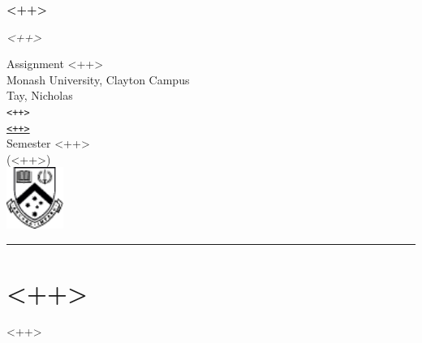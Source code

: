 \documentclass{article}
\newcommand{\metatitle}{<++>}
\newcommand{\metasubtitle}{<++>}
\newcommand{\metaauthor}{Tay, Nicholas}
\newcommand{\metaemail}{<++>}
\begin{document}
\thispagestyle{empty}
\parbox[b]{0.925\textwidth}{
\vspace*{8.5cm}
\begin{flushright}
    {
        \huge
        \textbf{\metatitle} \\[.35cm]
    }

    {
        \large
        \textit{\metasubtitle} \\[1.7cm]
    }

    Assignment <++> \\ %
    Monash University, Clayton Campus \\[.45cm]

    \metaauthor{} \\ %
    \texttt{<++>} \\ %
    \href{mailto:\metaemail{}}{\texttt{\metaemail{}}} \\[.45cm]

    Semester <++> \\ %
    (<++>)\\[2cm] %

    \includegraphics[height=2cm]{monash2.pdf}\\[0.25cm]
\end{flushright}
}
\hspace{0.025\textwidth}
\rule{0.5pt}{0.8\textheight}
\begin{center}
    \vspace*{\fill}
    \vspace{1cm}
\end{center}

\newpage


\section{<++>}
<++>

\newpage
\printbibliography
\end{document}
